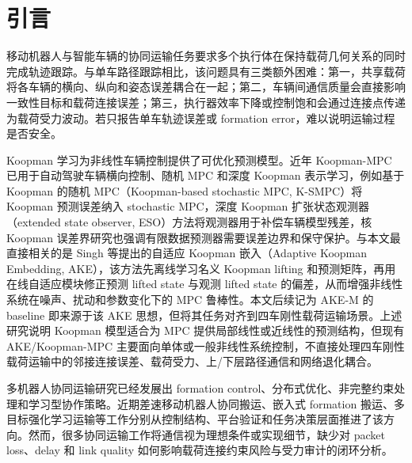 \documentclass[twocolumn,3p,times,procedia]{elsarticle}
\newif\ifNRReview
\newcommand{\reviewblock}[1]{\ifNRReview\par\smallskip\noindent\begingroup\setlength{\fboxsep}{4pt}\colorbox{yellow!35}{\parbox{0.96\linewidth}{\footnotesize\textbf{当前不足：} #1}}\endgroup\par\smallskip\fi}
\newcommand{\AKE}{AKE-M}
\begin{document}
\reviewblock{回头弯 no-offset 面板已由 r4c 更新到 r10c，single-seed 团队中心横向 RMSE 降至 0.0851 m、峰值降至 0.1804 m，满足 0.2 m 内的峰值目标；但最大逐点差距仍为 0.0666 m，不能写成“全过程严格小于 baseline”。15 m/s 正弦已由进度过强版本更新为 s15bal-c 局部平衡版本，可跑完整且横向 RMSE 从 0.1586 m 降至 0.1574 m、纵向 RMSE 从 0.8857 m 降至 0.8815 m；但最大逐点正 gap 仍为 0.0041 m，因此只能写作 RMSE/峰值改善，不能写作全过程严格逐点优于 baseline。载荷力峰值在若干场景中高于 \AKE{}，因此受力指标仍应作为代价审计项。}

\section{引言}

移动机器人与智能车辆的协同运输任务要求多个执行体在保持载荷几何关系的同时完成轨迹跟踪。与单车路径跟踪相比，该问题具有三类额外困难：第一，共享载荷将各车辆的横向、纵向和姿态误差耦合在一起；第二，车辆间通信质量会直接影响一致性目标和载荷连接误差；第三，执行器效率下降或控制饱和会通过连接点传递为载荷受力波动。若只报告单车轨迹误差或 formation error，难以说明运输过程是否安全。

Koopman 学习为非线性车辆控制提供了可优化预测模型。近年 Koopman-MPC 已用于自动驾驶车辆横向控制、随机 MPC 和深度 Koopman 表示学习，例如基于 Koopman 的随机 MPC（Koopman-based stochastic MPC, K-SMPC）将 Koopman 预测误差纳入 stochastic MPC，深度 Koopman 扩张状态观测器（extended state observer, ESO）方法将观测器用于补偿车辆模型残差，核 Koopman 误差界研究也强调有限数据预测器需要误差边界和保守保护\cite{kim2025ksmpc,chen2024esoDeepKoopman,philipp2023koopmanErrorBounds,cibulka2021koopmanVehicleMpc}。与本文最直接相关的是 Singh 等提出的自适应 Koopman 嵌入（Adaptive Koopman Embedding, AKE），该方法先离线学习名义 Koopman lifting 和预测矩阵，再用在线自适应模块修正预测 lifted state 与观测 lifted state 的偏差，从而增强非线性系统在噪声、扰动和参数变化下的 MPC 鲁棒性\cite{singh2025adaptiveKoopman}。本文后续记为 \AKE{} 的 baseline 即来源于该 AKE 思想，但将其任务对齐到四车刚性载荷运输场景。上述研究说明 Koopman 模型适合为 MPC 提供局部线性或近线性的预测结构，但现有 AKE/Koopman-MPC 主要面向单体或一般非线性系统控制，不直接处理四车刚性载荷运输中的邻接连接误差、载荷受力、上/下层路径通信和网络退化耦合。

多机器人协同运输研究已经发展出 formation control、分布式优化、非完整约束处理和学习型协作策略。近期差速移动机器人协同搬运、嵌入式 formation 搬运、多目标强化学习运输等工作分别从控制结构、平台验证和任务决策层面推进了该方向\cite{cooperativeTransport2024ras,embeddedFormationTransport2024cep,multiObjectiveTransport2024mechatronics,intelligentCollaborativeTransport2024}。然而，很多协同运输工作将通信视为理想条件或实现细节，缺少对 packet loss、delay 和 link quality 如何影响载荷连接约束风险与受力审计的闭环分析。
\end{document}
